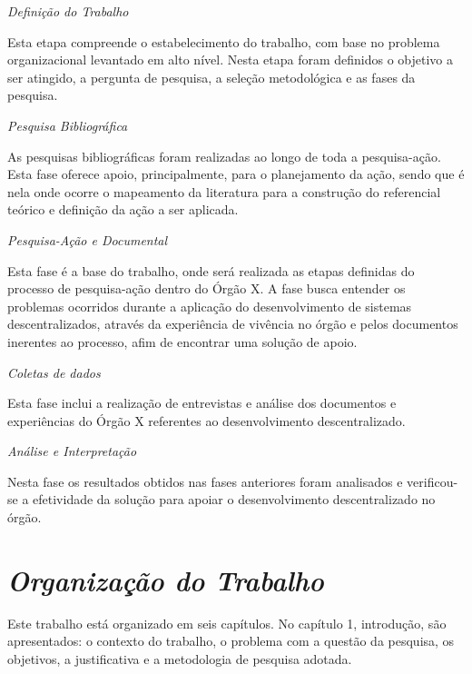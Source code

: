 \newpage

\textit{Definição do Trabalho}

Esta etapa compreende o estabelecimento do trabalho, com base no problema
organizacional levantado em alto nível. Nesta etapa foram definidos o objetivo a ser atingido, a pergunta de pesquisa, a seleção metodológica e as fases da pesquisa.

\textit{Pesquisa Bibliográfica}

As pesquisas bibliográficas foram realizadas ao longo de toda a pesquisa-ação. Esta fase oferece apoio, principalmente, para o planejamento da ação, sendo que é nela onde ocorre o mapeamento da literatura para a construção do referencial teórico e definição da ação a ser aplicada.

\textit{Pesquisa-Ação e Documental}

Esta fase é a base do trabalho, onde será realizada as etapas definidas do processo de pesquisa-ação dentro do Órgão X. A fase busca entender os problemas ocorridos durante a aplicação do desenvolvimento de sistemas descentralizados, através da experiência de vivência no órgão e pelos documentos inerentes ao processo, afim de encontrar uma solução de apoio.

\textit{Coletas de dados}

Esta fase inclui a realização de entrevistas e análise dos documentos e experiências do Órgão X referentes ao desenvolvimento descentralizado.

\textit{Análise e Interpretação}

Nesta fase os resultados obtidos nas fases anteriores foram analisados e verificou-se a efetividade da solução para apoiar o desenvolvimento descentralizado no órgão.

\section{\textit{Organização do Trabalho}}

Este trabalho está organizado em seis capítulos. No capítulo 1, introdução, são
apresentados: o contexto do trabalho, o problema com a questão da pesquisa, os
objetivos, a justificativa e a metodologia de pesquisa adotada.

